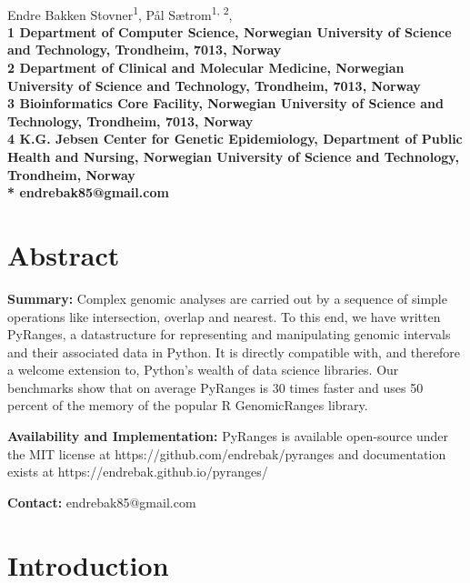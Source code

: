 \documentclass[10pt,letterpaper]{article}
\begin{document}
\vspace*{0.35in}

\begin{flushleft}
{\Large
  \textbf{}
}
\newline
\\
Endre Bakken Stovner\textsuperscript{1},
Pål Sætrom\textsuperscript{1, 2},
\\
\bf{1} Department of
  Computer Science, Norwegian University
  of Science and Technology, Trondheim, 7013, Norway
\\
\bf{2} Department of Clinical and Molecular Medicine, Norwegian
  University of Science and Technology, Trondheim, 7013, Norway
\\
\bf{3} Bioinformatics Core Facility, Norwegian University of Science and
Technology, Trondheim, 7013, Norway
\\
\bf{4} K.G. Jebsen Center for Genetic Epidemiology, Department of Public Health
and Nursing, Norwegian University of Science and Technology, Trondheim, Norway
\\
\bigskip
* endrebak85@gmail.com

\end{flushleft}

\section*{Abstract}

\textbf{Summary:} Complex genomic analyses are carried out by a sequence of
simple operations like intersection, overlap and nearest. To this end, we have
written PyRanges, a datastructure for representing and manipulating genomic
intervals and their associated data in Python. It is directly compatible with,
and therefore a welcome extension to, Python's wealth of data science libraries.
Our benchmarks show that on average PyRanges is 30 times faster and uses 50
percent of the memory of the popular R GenomicRanges library.

\textbf{Availability and Implementation:} PyRanges is available open-source under
the MIT license at https://github.com/endrebak/pyranges and documentation exists
at https://endrebak.github.io/pyranges/

\textbf{Contact:} endrebak85@gmail.com

\section*{Introduction}
\end{document}
